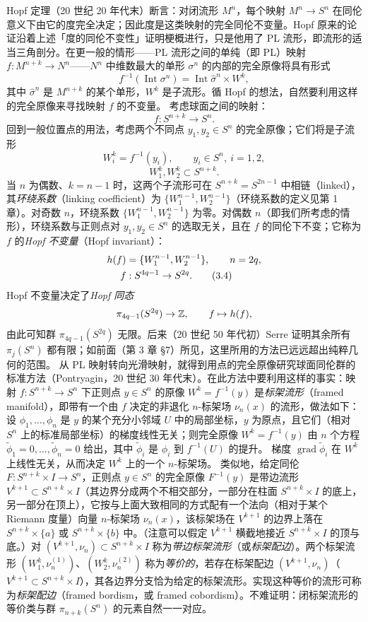 Hopf 定理（20 世纪 20 年代末）断言：对闭流形 $M^n$，每个映射 $M^n\to S^n$ 在同伦意义下由它的度完全决定；因此度是这类映射的完全同伦不变量。Hopf 原来的论证沿着上述「度的同伦不变性」证明梗概进行，只是他用了 PL 流形，即流形的适当三角剖分。在更一般的情形——PL 流形之间的单纯（即 PL）映射 $f:M^{n+k}\to N^n$——$N^n$ 中维数最大的单形 $\sigma^n$ 的内部的完全原像将具有形式
\begin{equation}
  f^{-1}(\operatorname{Int}\sigma^n)=\operatorname{Int}\hat\sigma^n\times W^k, \tag{3.3}
\end{equation}
其中 $\hat\sigma^n$ 是 $M^{n+k}$ 的某个单形，$W^k$ 是子流形。循 Hopf 的想法，自然要利用这样的完全原像来寻找映射 $f$ 的不变量。
考虑球面之间的映射：
\[
  f:S^{n+k}\to S^n.
\]
回到一般位置点的用法，考虑两个不同点 $y_1,y_2\in S^n$ 的完全原像；它们将是子流形
\[
  W^k_i=f^{-1}(y_i),\qquad y_i\in S^n,\ i=1,2,
\]
\[
  W^k_1,W^k_2\subset S^{n+k}.
\]
当 $n$ 为偶数、$k=n-1$ 时，这两个子流形可在 $S^{n+k}=S^{2n-1}$ 中相链（linked），其\emph{环绕系数}（linking coefficient）为 $\{W^{n-1}_1,W^{n-1}_2\}$（环绕系数的定义见第 1 章）。对奇数 $n$，环绕系数 $\{W^{n-1}_1,W^{n-1}_2\}$ 为零。对偶数 $n$（即我们所考虑的情形），环绕系数与正则点对 $y_1,y_2\in S^n$ 的选取无关，且在 $f$ 的同伦下不变；它称为 $f$ 的\emph{Hopf 不变量}（Hopf invariant）：
\begin{align}
  h(f)&=\{W^{n-1}_1,W^{n-1}_2\},\qquad n=2q,\notag\\
  f&:S^{4q-1}\to S^{2q}. \tag{3.4}
\end{align}
Hopf 不变量决定了\emph{Hopf 同态}
\[
  \pi_{4q-1}(S^{2q})\to\mathbb{Z},\qquad f\mapsto h(f),
\]
由此可知群 $\pi_{4q-1}(S^{2q})$ 无限。后来（20 世纪 50 年代初）Serre 证明其余所有 $\pi_j(S^n)$ 都有限；如前面（第 3 章 \S7）所见，这里所用的方法已远远超出纯粹几何的范围。
从 PL 映射转向光滑映射，就得到用点的完全原像研究球面同伦群的标准方法（Pontryagin，20 世纪 30 年代末）。在此方法中要利用这样的事实：映射 $f:S^{n+k}\to S^n$ 下正则点 $y\in S^n$ 的原像 $W^k=f^{-1}(y)$ 是\emph{标架流形}（framed manifold），即带有一个由 $f$ 决定的非退化 $n$-标架场 $\nu_n(x)$ 的流形，做法如下：设 $\phi_1,\dots,\phi_n$ 是 $y$ 的某个充分小邻域 $U$ 中的局部坐标，$y$ 为原点，且它们（相对 $S^n$ 上的标准局部坐标）的梯度线性无关；则完全原像 $W^k=f^{-1}(y)$ 由 $n$ 个方程 $\tilde\phi_1=0,\dots,\tilde\phi_n=0$ 给出，其中 $\tilde\phi_i$ 是 $\phi_i$ 到 $f^{-1}(U)$ 的提升。
梯度 $\operatorname{grad}\tilde\phi_i$ 在 $W^k$ 上线性无关，从而决定 $W^k$ 上的一个 $n$-标架场。
类似地，给定同伦 $F:S^{n+k}\times I\to S^n$，正则点 $y\in S^n$ 的完全原像 $F^{-1}(y)$ 是带边流形 $V^{k+1}\subset S^{n+k}\times I$（其边界分成两个不相交部分，一部分在柱面 $S^{n+k}\times I$ 的底上，另一部分在顶上），它按与上面大致相同的方式配有一个法向（相对于某个 Riemann 度量）向量 $n$-标架场 $\nu_n(x)$，该标架场在 $V^{k+1}$ 的边界上落在 $S^{n+k}\times\{a\}$ 或 $S^{n+k}\times\{b\}$ 中。（注意可以假定 $V^{k+1}$ 横截地接近 $S^{n+k}\times I$ 的顶与底。）对 $(V^{k+1},\nu_n)\subset S^{n+k}\times I$ 称为\emph{带边标架流形}（或\emph{标架配边}）。两个标架流形 $(W^k_1,\nu^{(1)}_n)$、$(W^k_2,\nu^{(2)}_n)$ 称为\emph{等价的}，若存在标架配边 $(V^{k+1},\nu_n)$（$V^{k+1}\subset S^{n+k}\times I$），其各边界分支恰为给定的标架流形。实现这种等价的流形可称为\emph{标架配边}（framed bordism，或 framed cobordism）。不难证明：闭标架流形的等价类与群 $\pi_{n+k}(S^n)$ 的元素自然一一对应。
